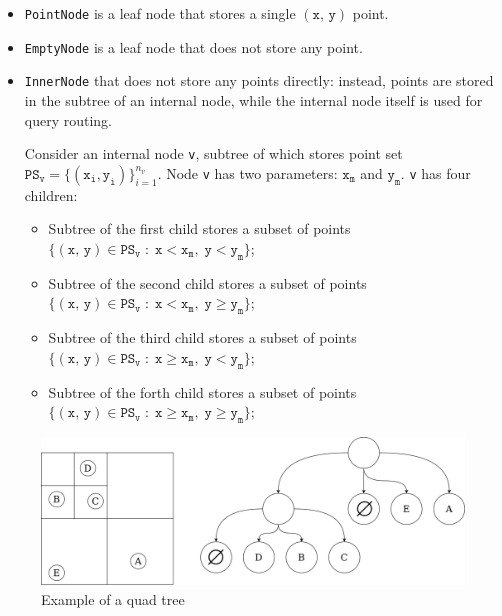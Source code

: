 \documentclass[times, dvipsnames,%
               languages={russian,english} %
              ]{itmo-student-thesis}
\begin{document}
\begin{itemize}
    \item \texttt{PointNode} is a leaf node that stores a single $\left( \texttt{x, y} \right)$ point.
    
    \item \texttt{EmptyNode} is a leaf node that does not store any point.
    
    \item \texttt{InnerNode} that does not store any points directly: instead, points are stored in the subtree of an internal node, while the internal node itself is used for query routing.
    
    Consider an internal node \texttt{v}, subtree of which stores point set $\texttt{PS}_{\texttt{v}} = \{\left( \texttt{x}_{\texttt{i}}, \texttt{y}_{\texttt{i}}\right)\}_{i = 1}^{n_v}$. Node \texttt{v} has two parameters: $\texttt{x}_{\texttt{m}}$ and $\texttt{y}_{\texttt{m}}$. \texttt{v} has four children: 
    
    \begin{itemize}
        \item Subtree of the first child stores a subset of points $\{\left( \texttt{x, y} \right) \in \texttt{PS}_{\texttt{v}} \; : \; \texttt{x} < \texttt{x}_{\texttt{m}}, \; \texttt{y} < \texttt{y}_{\texttt{m}}\}$;
        
        \item Subtree of the second child stores a subset of points $\{\left( \texttt{x, y} \right) \in \texttt{PS}_{\texttt{v}} \; : \; \texttt{x} < \texttt{x}_{\texttt{m}}, \; \texttt{y} \geq \texttt{y}_{\texttt{m}}\}$;
        
        \item Subtree of the third child stores a subset of points $\{\left( \texttt{x, y} \right) \in \texttt{PS}_{\texttt{v}} \; : \; \texttt{x} \geq \texttt{x}_{\texttt{m}}, \; \texttt{y} < \texttt{y}_{\texttt{m}}\}$;
        
        \item Subtree of the forth child stores a subset of points $\{\left( \texttt{x, y} \right) \in \texttt{PS}_{\texttt{v}} \; : \; \texttt{x} \geq \texttt{x}_{\texttt{m}}, \; \texttt{y} \geq \texttt{y}_{\texttt{m}}\}$;
    \end{itemize}
\end{itemize}

\begin{figure}[H]
  \centering
  \caption{Example of a quad tree}
  \label{quad-tree-applicability-pic}
  \includegraphics[width=\linewidth]{pics/quad-tree.png}
\end{figure}
\end{document}
